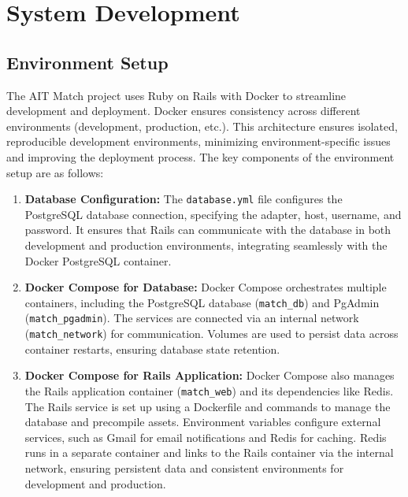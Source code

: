     \section{System Development}
    \subsection{Environment Setup}
    The AIT Match project uses Ruby on Rails with Docker to streamline development and deployment. Docker ensures consistency across different environments (development, production, etc.). This architecture ensures isolated, reproducible development environments, minimizing environment-specific issues and improving the deployment process. The key components of the environment setup are as follows:
    
    \begin{enumerate}
        \item \textbf{Database Configuration:} 
        The \texttt{database.yml} file configures the PostgreSQL database connection, specifying the adapter, host, username, and password. It ensures that Rails can communicate with the database in both development and production environments, integrating seamlessly with the Docker PostgreSQL container.
    
        \item \textbf{Docker Compose for Database:} 
        Docker Compose orchestrates multiple containers, including the PostgreSQL database (\texttt{match\_db}) and PgAdmin (\texttt{match\_pgadmin}). The services are connected via an internal network (\texttt{match\_network}) for communication. Volumes are used to persist data across container restarts, ensuring database state retention.
    
        \item \textbf{Docker Compose for Rails Application:} 
        Docker Compose also manages the Rails application container (\texttt{match\_web}) and its dependencies like Redis. The Rails service is set up using a Dockerfile and commands to manage the database and precompile assets. Environment variables configure external services, such as Gmail for email notifications and Redis for caching. Redis runs in a separate container and links to the Rails container via the internal network, ensuring persistent data and consistent environments for development and production.
    \end{enumerate}
\newpage
